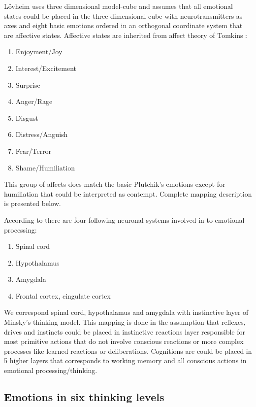 Lövheim uses three dimensional model-cube and assumes that all emotional states could be placed in the three dimensional cube with neurotransmitters as axes and eight basic emotions ordered in an orthogonal coordinate system that are affective states. Affective states are inherited from affect theory of Tomkins \cite{tomkins1, tomkins2, tomkins3, tomkins4}:

\begin{enumerate}
\item  Enjoyment/Joy
\item  Interest/Excitement
\item  Surprise
\item  Anger/Rage
\item  Disgust
\item  Distress/Anguish
\item  Fear/Terror
\item  Shame/Humiliation
\end{enumerate}

This group of affects does match the basic Plutchik's emotions except for humiliation that could be interpreted as contempt. Complete mapping description is presented below.

According to \cite{emotionsbraintorobot} there are four following neuronal systems involved in to emotional processing:

\begin{enumerate}
\item  Spinal cord
\item  Hypothalamus
\item  Amygdala
\item  Frontal cortex, cingulate cortex
\end{enumerate}

We correspond spinal cord, hypothalamus and amygdala with instinctive layer of Minsky's thinking model. This mapping is done in the assumption that reflexes, drives and instincts could be placed in instinctive reactions layer responsible for most primitive actions that do not involve conscious reactions or more complex processes like learned reactions or deliberations. Cognitions are could be placed in 5 higher layers that corresponds to working memory and all conscious actions in emotional processing/thinking.

\subsection{Emotions in six thinking levels}

